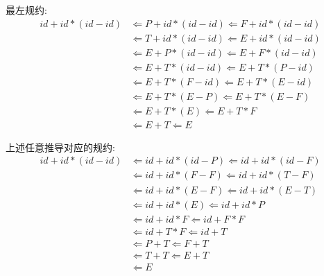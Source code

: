 \documentclass{article}
\begin{document}
最左规约:
\begin{align*}
    id + id * (id - id) & \Leftarrow P + id * (id - id) \Leftarrow F + id * (id - id) \\
                        & \Leftarrow T + id * (id - id) \Leftarrow E + id * (id - id) \\
                        & \Leftarrow E + P * (id - id) \Leftarrow E + F * (id - id) \\
                        & \Leftarrow E + T * (id - id) \Leftarrow E + T * (P - id) \\
                        & \Leftarrow E + T * (F - id) \Leftarrow E + T * (E - id) \\
                        & \Leftarrow E + T * (E - P) \Leftarrow E + T * (E - F) \\
                        & \Leftarrow E + T * (E) \Leftarrow E + T * F \\
                        & \Leftarrow E + T \Leftarrow E
\end{align*}

上述任意推导对应的规约:
\begin{align*}
    id + id * (id - id) & \Leftarrow id + id * (id - P) \Leftarrow id + id * (id - F) \\
                        & \Leftarrow id + id * (F - F) \Leftarrow id + id * (T - F) \\
                        & \Leftarrow id + id * (E - F) \Leftarrow id + id * (E - T) \\
                        & \Leftarrow id + id * (E) \Leftarrow id + id * P \\
                        & \Leftarrow id + id * F \Leftarrow id + F * F \\
                        & \Leftarrow id + T * F \Leftarrow id + T \\
                        & \Leftarrow P + T \Leftarrow F + T \\
                        & \Leftarrow T + T \Leftarrow E + T \\
                        & \Leftarrow E
\end{align*}
\end{document}
